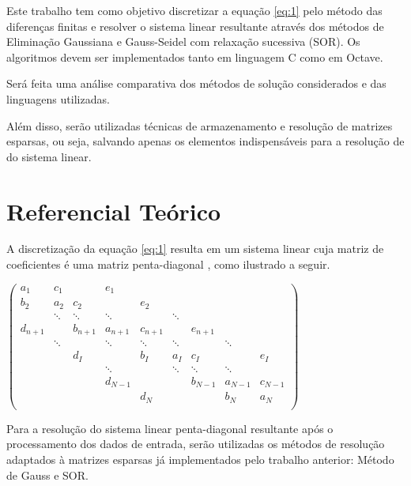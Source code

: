 \documentclass[
	11pt,				%
	oneside,			%
	a4paper,			%
	english,			%
	brazil,				%
	]{article}
\begin{document}
Este trabalho tem como objetivo discretizar a equação \eqref{eq:1} pelo método das diferenças finitas e resolver o sistema linear resultante através dos métodos de Eliminação Gaussiana e Gauss-Seidel com relaxação sucessiva (SOR). Os algoritmos devem ser implementados tanto em linguagem C como em Octave.

Será feita uma análise comparativa dos métodos de solução considerados e das linguagens utilizadas.

Além disso, serão utilizadas técnicas de armazenamento e resolução de matrizes esparsas, ou seja, salvando apenas os elementos indispensáveis para a resolução de do sistema linear.

\section{Referencial Teórico}
A discretização da equação \eqref{eq:1} resulta em um sistema linear cuja matriz de coeficientes é uma matriz penta-diagonal \cite{bvp}, como ilustrado a seguir.

$
\begin{pmatrix}
	a_1     & c_1     &         & e_1     &         &         &         &         &         \\
	b_2     & a_2     & c_2     &         & e_2     &         &         &         &         \\
	        & \ddots  & \ddots  & \ddots  &         & \ddots  &         &         &         \\
	d_{n+1} &         & b_{n+1} & a_{n+1} & c_{n+1} &         & e_{n+1} &         &         \\
	        & \ddots  &         & \ddots  & \ddots  & \ddots  &         & \ddots  &         \\
	        &         & d_I     &         & b_I     & a_I     & c_I     &         & e_I     \\
	        &         &         & \ddots  &         & \ddots  & \ddots  & \ddots  &         \\
	        &         &         & d_{N-1} &         &         & b_{N-1} & a_{N-1} & c_{N-1} \\
	        &         &         &         & d_N     &         &         & b_N     & a_N     \\
\end{pmatrix}
$

Para a resolução do sistema linear penta-diagonal resultante após o processamento dos dados de entrada, serão utilizadas os métodos de resolução adaptados à matrizes esparsas já implementados pelo trabalho anterior: Método de Gauss e SOR.
\end{document}
